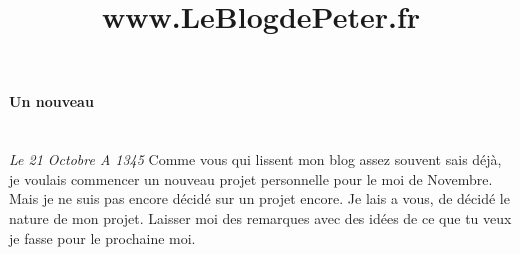 \documentclass{article}
\begin{document}
\title{www.LeBlogdePeter.fr}

\paragraph{Un nouveau}\\ \emph{Le 21 Octobre A 1345}
Comme vous qui lissent mon blog assez souvent sais déjà, je voulais commencer un nouveau projet personnelle pour le moi de Novembre. Mais je ne suis pas encore décidé sur un projet encore. Je lais a vous, de décidé le nature de mon projet. Laisser moi des remarques avec des idées de ce que tu veux je fasse pour le prochaine moi.
\end{document}
